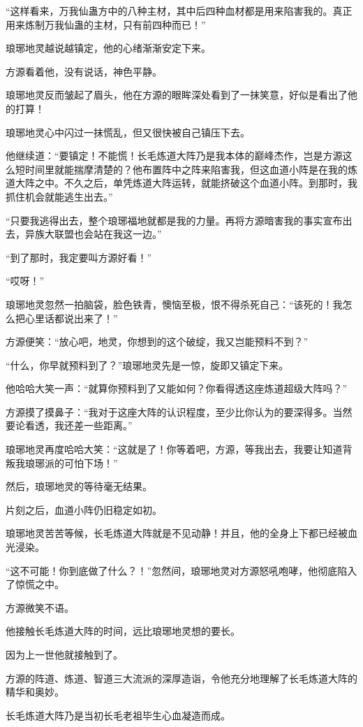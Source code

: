\begin{this_body}
“这样看来，万我仙蛊方中的八种主材，其中后四种血材都是用来陷害我的。真正用来炼制万我仙蛊的主材，只有前四种而已！”

琅琊地灵越说越镇定，他的心绪渐渐安定下来。

方源看着他，没有说话，神色平静。

琅琊地灵反而皱起了眉头，他在方源的眼眸深处看到了一抹笑意，好似是看出了他的打算！

琅琊地灵心中闪过一抹慌乱，但又很快被自己镇压下去。

他继续道：“要镇定！不能慌！长毛炼道大阵乃是我本体的巅峰杰作，岂是方源这么短时间里就能揣摩清楚的？他布置阵中之阵来陷害我，但这血道小阵是在我的炼道大阵之中。不久之后，单凭炼道大阵运转，就能挤破这个血道小阵。到那时，我抓住机会就能逃生出去。”

“只要我逃得出去，整个琅琊福地就都是我的力量。再将方源暗害我的事实宣布出去，异族大联盟也会站在我这一边。”

“到了那时，我定要叫方源好看！”

“哎呀！”

琅琊地灵忽然一拍脑袋，脸色铁青，懊恼至极，恨不得杀死自己：“该死的！我怎么把心里话都说出来了！”

方源便笑：“放心吧，地灵，你想到的这个破绽，我又岂能预料不到？”

“什么，你早就预料到了？”琅琊地灵先是一惊，旋即又镇定下来。

他哈哈大笑一声：“就算你预料到了又能如何？你看得透这座炼道超级大阵吗？”

方源摸了摸鼻子：“我对于这座大阵的认识程度，至少比你认为的要深得多。当然要论看透，我还差一些距离。”

琅琊地灵再度哈哈大笑：“这就是了！你等着吧，方源，等我出去，我要让知道背叛我琅琊派的可怕下场！”

然后，琅琊地灵的等待毫无结果。

片刻之后，血道小阵仍旧稳定如初。

琅琊地灵苦苦等候，长毛炼道大阵就是不见动静！并且，他的全身上下都已经被血光浸染。

“这不可能！你到底做了什么？！”忽然间，琅琊地灵对方源怒吼咆哮，他彻底陷入了惊慌之中。

方源微笑不语。

他接触长毛炼道大阵的时间，远比琅琊地灵想的要长。

因为上一世他就接触到了。

方源的阵道、炼道、智道三大流派的深厚造诣，令他充分地理解了长毛炼道大阵的精华和奥妙。

长毛炼道大阵乃是当初长毛老祖毕生心血凝造而成。


\end{this_body}
